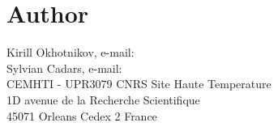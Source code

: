 \documentclass[a4paper,english]{article}
\begin{document}
\section{Author}
Kirill Okhotnikov, e-mail:  \\
Sylvian Cadars, e-mail:  \\ 
CEMHTI - UPR3079 CNRS Site Haute Temperature \\
1D avenue de la Recherche Scientifique \\
45071 Orleans Cedex 2 France
\noindent

\LatexManEnd
\end{document}
